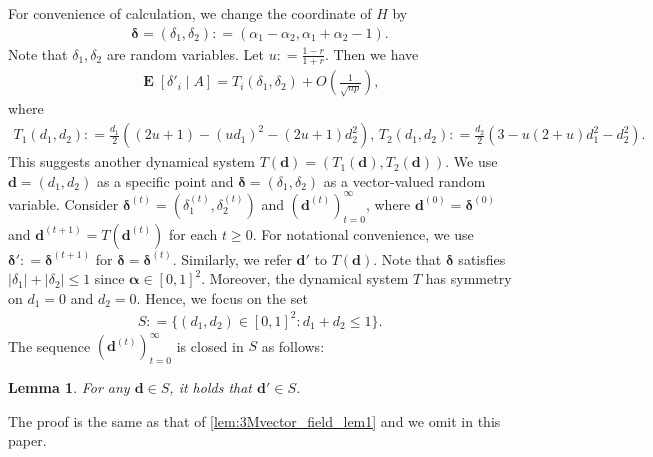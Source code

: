\documentclass[letterpaper,11pt]{article}
\newtheorem{lemma}[theorem]{Lemma}
\DeclareMathOperator{\E}{\mathbf{E}}
\def\defeq{\mathrel{\mathop:}=}%
\begin{document}
For convenience of calculation, we change the coordinate of $H$ by
\begin{align*}
{\boldsymbol \delta}=(\delta_1, \delta_2)\defeq (\alpha_1-\alpha_2, \alpha_1+\alpha_2-1).
\end{align*}
Note that $\delta_1,\delta_2$ are random variables.
Let $u\defeq\frac{1-r}{1+r}$. Then we have
\begin{align*}
\E[\delta'_i \mid A]=T_i(\delta_1,\delta_2)+O\left(\frac{1}{\sqrt{np}}\right),
\end{align*}
where
\begin{align}
T_1(d_1,d_2)\defeq \frac{d_1}{2}\left((2u+1)-(ud_1)^2-(2u+1) d_2^2\right), \, 
T_2(d_1,d_2)\defeq \frac{ d_2}{2}\left(3-u(2+u) d_1^2- d_2^2\right). \label{eqn:2Cvecfielddef}
\end{align}
%
This suggests another dynamical system $T(\mathbf{d})=(T_1(\mathbf{d}),T_2(\mathbf{d}))$.
We use $\mathbf{d}=(d_1,d_2)$ as a specific point and ${\boldsymbol \delta}=(\delta_1,\delta_2)$ as a vector-valued random variable.
Consider ${\boldsymbol \delta^{(t)}}=(\delta^{(t)}_1,\delta^{(t)}_2)$ and $(\mathbf{d}^{(t)})_{t=0}^\infty$, where $\mathbf{d}^{(0)}={\boldsymbol \delta}^{(0)}$ and $\mathbf{d}^{(t+1)}=T(\mathbf{d}^{(t)})$ for each $t\geq 0$.
For notational convenience, we use ${\boldsymbol \delta}'\defeq {\boldsymbol \delta}^{(t+1)}$ for ${\boldsymbol \delta}={\boldsymbol \delta}^{(t)}$.
Similarly, we refer $\mathbf{d}'$ to $T(\mathbf{d})$.
Note that ${\boldsymbol \delta}$ satisfies $|\delta_1|+|\delta_2|\leq 1$ since ${\boldsymbol \alpha}\in[0,1]^2$.
Moreover, the dynamical system $T$ has symmetry on $d_1=0$ and $d_2=0$.
Hence, we focus on the set
\begin{align*}
S\defeq \{(d_1,d_2)\in[0,1]^2:d_1+d_2\leq 1\}.
\end{align*}
The sequence $(\mathbf{d}^{(t)})_{t=0}^\infty $ is closed in $S$ as follows:
\begin{lemma} \label{lem:2Cvector_field_lem1}
For any $\mathbf{d}\in S$, it holds that $\mathbf{d}'\in S$.
\end{lemma}
The proof is the same as that of \cref{lem:3Mvector_field_lem1} and we omit in this paper.
\end{document}
